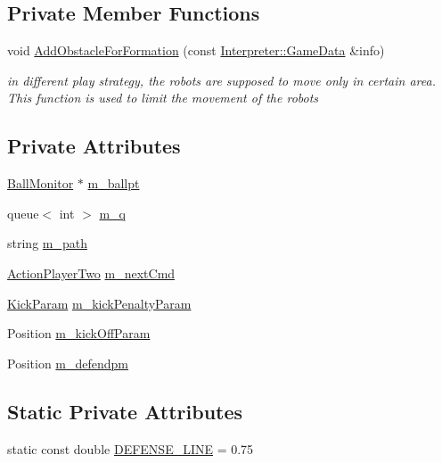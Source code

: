 \subsection*{Private Member Functions}
\begin{DoxyCompactItemize}
\item 
void \hyperlink{classPlayerTwo_a9e3341541658f54a2dfb0491a774b4d4}{AddObstacleForFormation} (const \hyperlink{structInterpreter_1_1GameData}{Interpreter::GameData} \&info)
\begin{DoxyCompactList}\small\item\em in different play strategy, the robots are supposed to move only in certain area. This function is used to limit the movement of the robots \item\end{DoxyCompactList}\end{DoxyCompactItemize}
\subsection*{Private Attributes}
\begin{DoxyCompactItemize}
\item 
\hyperlink{classBallMonitor}{BallMonitor} $\ast$ \hyperlink{classPlayerTwo_a14f2fe35deb15d4d45208273a51ec7eb}{m\_\-ballpt}
\item 
queue$<$ int $>$ \hyperlink{classPlayerTwo_ac2f70709bd48ad9f5c2435cbff1e65b3}{m\_\-q}
\item 
string \hyperlink{classPlayerTwo_af9880885ced53351b52dcc949f6df162}{m\_\-path}
\item 
\hyperlink{classPlayerTwo_a6dd2b1afb179fe02b677dd71ec5703d2}{ActionPlayerTwo} \hyperlink{classPlayerTwo_a35bab8a32976849cd72828a1a1fe8504}{m\_\-nextCmd}
\item 
\hyperlink{structPlayerTwo_1_1KickParam}{KickParam} \hyperlink{classPlayerTwo_ac0b6376133a18b87e4fa14036a32f0ff}{m\_\-kickPenaltyParam}
\item 
Position \hyperlink{classPlayerTwo_af294f3bef80e0df881b4452c1272376a}{m\_\-kickOffParam}
\item 
Position \hyperlink{classPlayerTwo_aa6b42d687884c55d1dd30034e7952605}{m\_\-defendpm}
\end{DoxyCompactItemize}
\subsection*{Static Private Attributes}
\begin{DoxyCompactItemize}
\item 
static const double \hyperlink{classPlayerTwo_a86e1752bf84fab5d093f93633d3e51da}{DEFENSE\_\-LINE} = 0.75
\end{DoxyCompactItemize}


